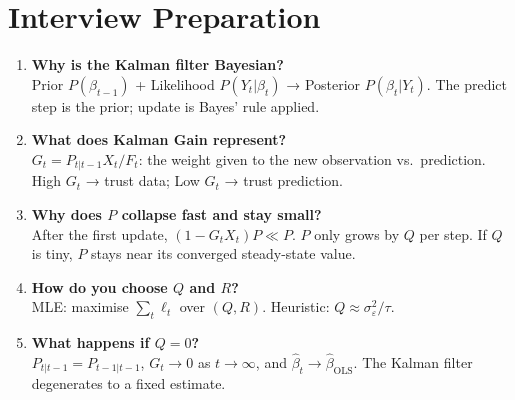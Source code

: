 \documentclass[10pt,a4paper,twocolumn]{article}
\begin{document}
\section{Interview Preparation}

\begin{tcolorbox}[exbox={Key Interview Questions}]
\begin{enumerate}\setlength\itemsep{2pt}
  \item \textbf{Why is the Kalman filter Bayesian?}\\
    Prior $P(\beta_{t-1})$ + Likelihood $P(Y_t|\beta_t)$ → Posterior $P(\beta_t|Y_t)$.
    The predict step is the prior; update is Bayes' rule applied.
  \item \textbf{What does Kalman Gain represent?}\\
    $G_t = P_{t|t-1}X_t/F_t$: the weight given to the new observation vs.\ prediction.
    High $G_t$ → trust data; Low $G_t$ → trust prediction.
  \item \textbf{Why does $P$ collapse fast and stay small?}\\
    After the first update, $(1-G_t X_t)P \ll P$.  $P$ only grows by $Q$ per step.
    If $Q$ is tiny, $P$ stays near its converged steady-state value.
  \item \textbf{How do you choose $Q$ and $R$?}\\
    MLE: maximise $\sum_t \ell_t$ over $(Q,R)$. Heuristic: $Q \approx \sigma_\varepsilon^2/\tau$.
  \item \textbf{What happens if $Q=0$?}\\
    $P_{t|t-1} = P_{t-1|t-1}$, $G_t \to 0$ as $t\to\infty$, and $\hat\beta_t\to\hat\beta_{\text{OLS}}$.
    The Kalman filter degenerates to a fixed estimate.
\end{enumerate}
\end{tcolorbox}
\end{document}
